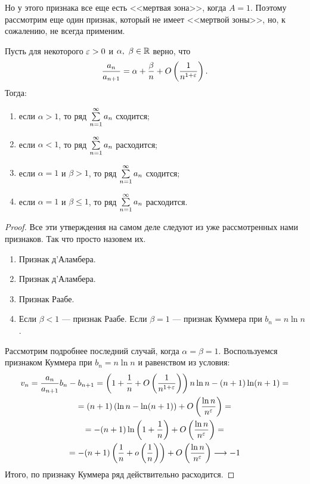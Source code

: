 \documentclass[a4paper, 12pt]{article}
\begin{document}
Но у этого признака все еще есть <<мертвая зона>>, когда $A = 1$. Поэтому рассмотрим еще один признак, который не имеет <<мертвой зоны>>, но, к сожалению, не всегда применим.

\begin{Test}
Пусть для некоторого $\varepsilon > 0$ и $\alpha,\ \beta \in \mathbb{R}$ верно, что 
$$
\dfrac{a_n}{a_{n+1}} = \alpha + \frac{\beta}{n} + O\left( \frac{1}{n^{1+\varepsilon}} \right).
$$
Тогда:
\begin{enumerate}
\item если $\alpha > 1$, то ряд $\sum\limits_{n=1}^{\infty}a_n$ сходится;
\item если $\alpha < 1$, то ряд $\sum\limits_{n=1}^{\infty}a_n$ расходится;
\item если $\alpha=1$ и $\beta>1$, то ряд $\sum\limits_{n=1}^{\infty}a_n$ сходится;
\item если $\alpha=1$ и $\beta\leq1$, то ряд $\sum\limits_{n=1}^{\infty}a_n$ расходится.
\end{enumerate}
\end{Test}

\begin{proof}
Все эти утверждения на самом деле следуют из уже рассмотренных нами признаков. Так что просто назовем их.
\begin{enumerate}
\item Признак д'Аламбера.
\item Признак д'Аламбера.
\item Признак Раабе.
\item Если $\beta<1$ --- признак Раабе. Если $\beta = 1$ --- признак Куммера при $b_n = n\ln n$.
\end{enumerate}
Рассмотрим подробнее последний случай, когда $\alpha=\beta=1$. Воспользуемся признаком Куммера при $b_n = n\ln n$ и равенством из условия:
\begin{gather*}
v_n = \frac{a_n}{a_{n+1}}b_n - b_{n+1} = \left( 1 + \frac{1}{n} + O\left( \frac{1}{n^{1+\varepsilon}}\right) \right)n\ln n - (n+1)\ln(n+1) = \\
= (n+1)\left( \ln n - \ln(n+1) \right) + O\left( \frac{\ln n}{n^\varepsilon} \right) = \\
= -(n+1)\ln\left( 1 + \frac{1}{n} \right) + O\left( \frac{\ln n}{n^\varepsilon} \right) = \\
= -(n+1)\left( \frac{1}{n} + o\left(\frac{1}{n}\right) \right) + O\left( \frac{\ln n}{n^\varepsilon} \right) \longrightarrow -1
\end{gather*}
Итого, по признаку Куммера ряд действительно расходится.
\end{proof}
\end{document}
